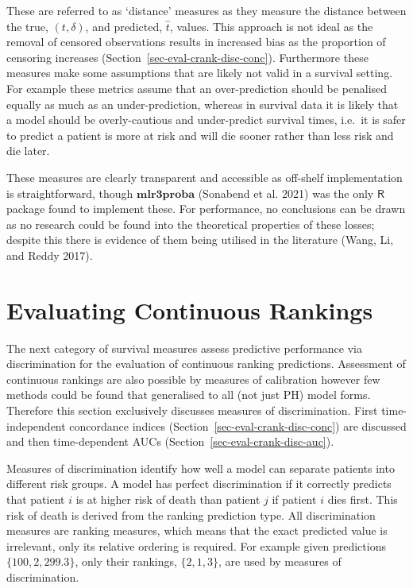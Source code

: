 \documentclass[
  letterpaper,
]{scrbook}
\theoremstyle{plain}
\theoremstyle{definition}
\theoremstyle{remark}
\begin{document}
These are referred to as `distance' measures as they measure the
distance between the true, \((t, \delta)\), and predicted, \(\hat{t}\),
values. This approach is not ideal as the removal of censored
observations results in increased bias as the proportion of censoring
increases (Section~\ref{sec-eval-crank-disc-conc}). Furthermore these
measures make some assumptions that are likely not valid in a survival
setting. For example these metrics assume that an over-prediction should
be penalised equally as much as an under-prediction, whereas in survival
data it is likely that a model should be overly-cautious and
under-predict survival times, i.e.~it is safer to predict a patient is
more at risk and will die sooner rather than less risk and die later.

These measures are clearly transparent and accessible as off-shelf
implementation is straightforward, though \(\textbf{mlr3proba}\)
(Sonabend et al. 2021) was the only \(\textsf{R}\) package found to
implement these. For performance, no conclusions can be drawn as no
research could be found into the theoretical properties of these losses;
despite this there is evidence of them being utilised in the literature
(Wang, Li, and Reddy 2017).

\hypertarget{sec-eval-crank}{%
\section{Evaluating Continuous Rankings}\label{sec-eval-crank}}

The next category of survival measures assess predictive performance via
discrimination for the evaluation of continuous ranking predictions.
Assessment of continuous rankings are also possible by measures of
calibration however few methods could be found that generalised to all
(not just PH) model forms. Therefore this section exclusively discusses
measures of discrimination. First time-independent concordance indices
(Section~\ref{sec-eval-crank-disc-conc}) are discussed and then
time-dependent AUCs (Section~\ref{sec-eval-crank-disc-auc}).

Measures of discrimination identify how well a model can separate
patients into different risk groups. A model has perfect discrimination
if it correctly predicts that patient \(i\) is at higher risk of death
than patient \(j\) if patient \(i\) dies first. This risk of death is
derived from the ranking prediction type. All discrimination measures
are ranking measures, which means that the exact predicted value is
irrelevant, only its relative ordering is required. For example given
predictions \(\{100,2,299.3\}\), only their rankings, \(\{2,1,3\}\), are
used by measures of discrimination.
\end{document}
